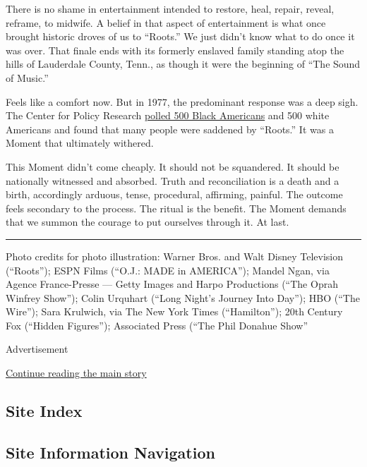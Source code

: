There is no shame in entertainment intended to restore, heal, repair,
reveal, reframe, to midwife. A belief in that aspect of entertainment is
what once brought historic droves of us to ``Roots.'' We just didn't
know what to do once it was over. That finale ends with its formerly
enslaved family standing atop the hills of Lauderdale County, Tenn., as
though it were the beginning of ``The Sound of Music.''

Feels like a comfort now. But in 1977, the predominant response was a
deep sigh. The Center for Policy Research
\href{https://www.nytimes3xbfgragh.onion/1977/06/07/archives/blacks-and-whites-found-to-have-misapprehensions-on-impact-of-roots.html?searchResultPosition=9}{polled
500 Black Americans} and 500 white Americans and found that many people
were saddened by ``Roots.'' It was a Moment that ultimately withered.

This Moment didn't come cheaply. It should not be squandered. It should
be nationally witnessed and absorbed. Truth and reconciliation is a
death and a birth, accordingly arduous, tense, procedural, affirming,
painful. The outcome feels secondary to the process. The ritual is the
benefit. The Moment demands that we summon the courage to put ourselves
through it. At last.

\begin{center}\rule{0.5\linewidth}{\linethickness}\end{center}

Photo credits for photo illustration: Warner Bros. and Walt Disney
Television (``Roots''); ESPN Films (``O.J.: MADE in AMERICA''); Mandel
Ngan, via Agence France-Presse --- Getty Images and Harpo Productions
(``The Oprah Winfrey Show''); Colin Urquhart (``Long Night's Journey
Into Day''); HBO (``The Wire''); Sara Krulwich, via The New York Times
(``Hamilton''); 20th Century Fox (``Hidden Figures''); Associated Press
(``The Phil Donahue Show''

Advertisement

\protect\hyperlink{after-bottom}{Continue reading the main story}

\hypertarget{site-index}{%
\subsection{Site Index}\label{site-index}}

\hypertarget{site-information-navigation}{%
\subsection{Site Information
Navigation}\label{site-information-navigation}}


